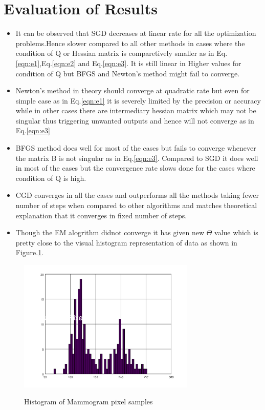 \documentclass[paper=a4, fontsize=11pt]{scrartcl}
\numberwithin{equation}{section}		%
\numberwithin{figure}{section}			%
\numberwithin{table}{section}				%
\begin{document}
\section{Evaluation of Results}
\begin{itemize}
  \item It can be observed that SGD decreases at linear rate for all the optimization problems.Hence slower compared to all other methods in cases where the condition of Q or Hessian matrix is comparetively smaller as in Eq.\ref{eqn:e1},Eq.\ref{eqn:e2} and Eq.\ref{eqn:e3}. It is still linear in Higher values for condition of Q but BFGS and Newton's method might fail to converge.
  \item Newton's method in theory should converge at quadratic rate but even for simple case as in Eq.\ref{eqn:e1} it is severely limited by the precision or accuracy while in other cases there are intermediary hessian matrix which may not be singular thus triggering unwanted outputs and hence will not converge as in Eq.\ref{eqn:e3}
  \item BFGS method does well for most of the cases but fails to converge whenever the matrix B is not singular as in Eq.\ref{eqn:e3}. Compared to SGD it does well in most of the cases but the convergence rate slows done for the cases where condition of Q is high.
  \item CGD converges in all the cases and outperforms all the methods taking fewer number of steps when compared to other algorithms and matches theoretical explanation that it converges in fixed number of steps.
  \item Though the EM alogrithm didnot converge it has given new $\Theta$ value which is pretty close to the visual histogram representation of data as shown in Figure.\ref{out17}.  
\end{itemize}
\begin{figure}[H]
\caption{Histogram of Mammogram pixel samples}
\centering
\includegraphics[width=0.75\textwidth]{histogram.png}
\label{out17}
\end{figure}
\end{document}
